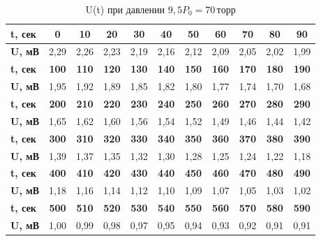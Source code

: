 \documentclass[a4paper, fontsize = 14pt]{article}
\begin{document}
\begin{table}[h]
\centering
\caption{U(t) при давлении $9,5P_0=70 \, торр$}
\begin{tabular}{|l|c|c|c|c|c|c|c|c|c|c|}
\hline
\textbf{t, сек} & \textbf{0}   & \textbf{10}  & \textbf{20}  & \textbf{30}  & \textbf{40}  & \textbf{50}  & \textbf{60}  & \textbf{70}  & \textbf{80}  & \textbf{90}  \\ \hline
\textbf{U, мВ}  & 2,29         & 2,26         & 2,23         & 2,19         & 2,16         & 2,12         & 2,09         & 2,05         & 2,02         & 1,99         \\ \hline
\textbf{t, сек} & \textbf{100} & \textbf{110} & \textbf{120} & \textbf{130} & \textbf{140} & \textbf{150} & \textbf{160} & \textbf{170} & \textbf{180} & \textbf{190} \\ \hline
\textbf{U, мВ}  & 1,95         & 1,92         & 1,89         & 1,85         & 1,82         & 1,80         & 1,77         & 1,74         & 1,70         & 1,68         \\ \hline
\textbf{t, сек} & \textbf{200} & \textbf{210} & \textbf{220} & \textbf{230} & \textbf{240} & \textbf{250} & \textbf{260} & \textbf{270} & \textbf{280} & \textbf{290} \\ \hline
\textbf{U, мВ}  & 1,65         & 1,62         & 1,60         & 1,56         & 1,54         & 1,52         & 1,49         & 1,46         & 1,44         & 1,42         \\ \hline
\textbf{t, сек} & \textbf{300} & \textbf{310} & \textbf{320} & \textbf{330} & \textbf{340} & \textbf{350} & \textbf{360} & \textbf{370} & \textbf{380} & \textbf{390} \\ \hline
\textbf{U, мВ}  & 1,39         & 1,37         & 1,35         & 1,32         & 1,30         & 1,28         & 1,25         & 1,24         & 1,22         & 1,18         \\ \hline
\textbf{t, сек} & \textbf{400} & \textbf{410} & \textbf{420} & \textbf{430} & \textbf{440} & \textbf{450} & \textbf{460} & \textbf{470} & \textbf{480} & \textbf{490} \\ \hline
\textbf{U, мВ}  & 1,18         & 1,16         & 1,14         & 1,12         & 1,10         & 1,09         & 1,07         & 1,05         & 1,03         & 1,02         \\ \hline
\textbf{t, сек} & \textbf{500} & \textbf{510} & \textbf{520} & \textbf{530} & \textbf{540} & \textbf{550} & \textbf{560} & \textbf{570} & \textbf{580} & \textbf{590} \\ \hline
\textbf{U, мВ}  & 1,00         & 0,99         & 0,98         & 0,97         & 0,95         & 0,94         & 0,93         & 0,92         & 0,91         & 0,91         \\ \hline
\end{tabular}
\end{table}
\end{document}
